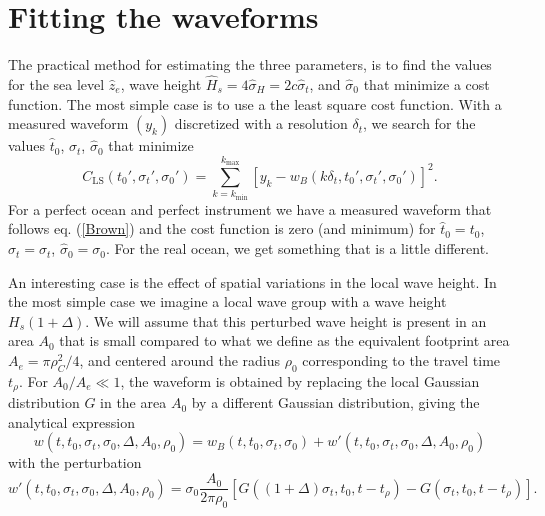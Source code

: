 \section{Fitting the waveforms}

The practical method for estimating the three parameters, is to find the values for the sea level $\widehat{z}_e$, wave height $\widehat{H}_s=4 \widehat{\sigma}_H= 2 c \widehat{\sigma}_t$, and $\widehat{\sigma}_0$ that minimize a cost function. The most simple case is to use a the least square cost 
function. With a measured waveform $(y_k)$ discretized with a resolution $\delta_t$, we search for the values  $\widehat{t}_0$, $\widehat{\sigma}_t$, $\widehat{\sigma}_0$ that minimize 
\begin{equation} 
    C_{\mathrm{LS}}(t_0',\sigma_t',\sigma_0')=\sum_{k=k_{\min}}^{k_{\max}}  \left[ y_k - w_B(k \delta_t,t_0',\sigma_t',\sigma_0') \right]^2. \label{eq_CLS}
\end{equation}
For a perfect ocean and perfect instrument we have a measured waveform that follows eq. (\ref{Brown}) and the cost function is zero (and minimum) for 
$\widehat{t}_0=t_0$, $\widehat{\sigma}_t=\sigma_t$, $\widehat{\sigma}_0=\sigma_0$. For the real ocean, we get something that is a little different. 

An interesting case is the effect of spatial variations in the local wave height. In the most simple case we imagine a local wave group with a wave height $H_s(1+\Delta)$. We will assume that this perturbed wave height is present in an area $A_0$ that is small compared to what we define as the equivalent footprint area $A_e= \pi \rho_C^2/4$, and centered around the radius $\rho_0$ corresponding to the travel time $t_\rho$. For $A_0/A_e \ll 1$, the waveform is obtained by replacing the local Gaussian distribution $G$ in the area $A_0$ by a different Gaussian distribution, giving the analytical expression 
\begin{equation}
    w(t,t_0,\sigma_t,\sigma_0,\Delta, A_0,\rho_0)=  w_B(t,t_0,\sigma_t,\sigma_0) + w'(t,t_0,\sigma_t,\sigma_0,\Delta, A_0,\rho_0)
\end{equation}
with the perturbation 
\begin{equation}
    w'(t,t_0,\sigma_t,\sigma_0,\Delta, A_0,\rho_0) = \sigma_0 \frac{A_0}{2 \pi \rho_0} \left[ G((1+\Delta)\sigma_t,t_0,t-t_\rho)- G(\sigma_t,t_0,t-t_\rho)  \right].
\end{equation}

